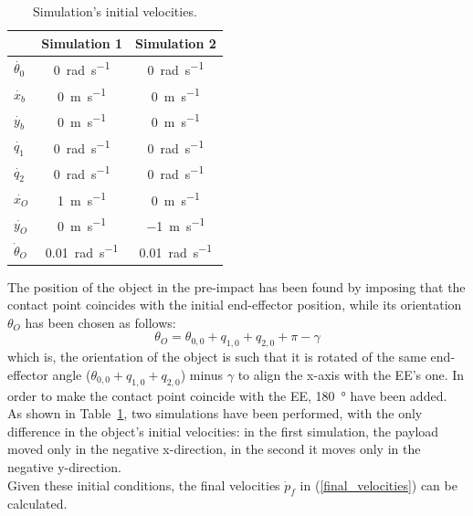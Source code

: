 \documentclass[a4paper,12pt,oneside]{report}
\begin{document}
\begin{table}
  \caption{Simulation's initial velocities.}
  \label{initial_velocities}
  \begin{center}
  \begin{tabular}{lcc}
    \toprule
    &\textbf{Simulation 1}&\textbf{Simulation 2}\\
  \midrule
  $\dot{\theta_0}$&\SI{0}{\radian\per\second}&\SI{0}{\radian\per\second}\\
  $\dot{x_b}$&\SI{0}{\metre\per\second}&\SI{0}{\metre\per\second}\\
  $\dot{y_b}$&\SI{0}{\metre\per\second}&\SI{0}{\metre\per\second}\\
  $\dot{q_1}$&\SI{0}{\radian\per\second}&\SI{0}{\radian\per\second}\\
  $\dot{q_2}$&\SI{0}{\radian\per\second}&\SI{0}{\radian\per\second}\\
  $\dot{x_O}$&\SI{1}{\metre\per\second}&\SI{0}{\metre\per\second}\\
  $\dot{y_O}$&\SI{0}{\metre\per\second}&\SI{-1}{\metre\per\second}\\
  $\dot{\theta}_O$&\SI{0.01}{\radian\per\second}&\SI{0.01}{\radian\per\second}\\
  \bottomrule
  \end{tabular}
  \end{center}
\end{table}
The position of the object in the pre-impact has been found by imposing that the contact point coincides with the initial end-effector position, while its orientation $\theta_O$ has been chosen as follows:
\begin{equation}
  \theta_O=\theta_{0,0}+q_{1,0}+q_{2,0}+\pi-\gamma
  \label{contact_rotation}
\end{equation}
which is, the orientation of the object is such that it is rotated of the same end-effector angle ($\theta_{0,0}+q_{1,0}+q_{2,0}$) minus $\gamma$ to align the x-axis with the EE's one. In order to make the contact point coincide with the EE, \SI{180}{\degree} have been added.\\
As shown in Table~\ref{initial_velocities}, two simulations have been performed, with the only difference in the object's initial velocities: in the first simulation, the payload moved only in the negative x-direction, in the second it moves only in the negative y-direction.\\
Given these initial conditions, the final velocities $\dot{p}_f$ in (\ref{final_velocities}) can be calculated.\\
\end{document}
